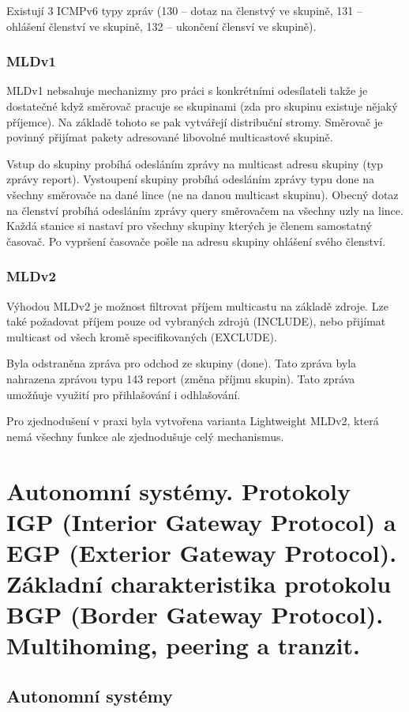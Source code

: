 Existují 3 ICMPv6 typy zpráv (130 -- dotaz na členstvý ve skupině, 131 -- ohlášení členství ve skupině, 132 -- ukončení člensví ve skupině).


\subsubsection{MLDv1}

MLDv1 nebsahuje mechanizmy pro práci s konkrétními odesílateli takže je dostatečné když směrovač pracuje se skupinami (zda pro skupinu existuje nějaký příjemce).
Na základě tohoto se pak vytvářejí distribuční stromy.
Směrovač je povinný přijímat pakety adresované libovolné multicastové skupině.

Vstup do skupiny probíhá odesláním zprávy na multicast adresu skupiny (typ zprávy report).
Vystoupení skupiny probíhá odesláním zprávy typu done na všechny směrovače na dané lince (ne na danou multicast skupinu).
Obecný dotaz na členství probíhá odesláním zprávy query směrovačem na všechny uzly na lince.
Každá stanice si nastaví pro všechny skupiny kterých je členem samostatný časovač.
Po vypršení časovače pošle na adresu skupiny ohlášení svého členství.

\subsubsection{MLDv2}

Výhodou MLDv2 je možnost filtrovat příjem multicastu na základě zdroje.
Lze také požadovat příjem pouze od vybraných zdrojů (INCLUDE), nebo přijímat multicast od všech kromě specifikovaných (EXCLUDE).

Byla odstraněna zpráva pro odchod ze skupiny (done).
Tato zpráva byla nahrazena zprávou typu 143 report (změna příjmu skupin).
Tato zpráva umožňuje využití pro přihlašování i odhlašování.

Pro zjednodušení v praxi byla vytvořena varianta Lightweight MLDv2, která nemá všechny funkce ale zjednodušuje celý mechanismus.


\clearpage
\section{Autonomní systémy. Protokoly IGP (Interior Gateway Protocol) a EGP (Exterior Gateway Protocol). Základní charakteristika protokolu BGP (Border Gateway Protocol). Multihoming, peering a tranzit.}

\subsection{Autonomní systémy}

